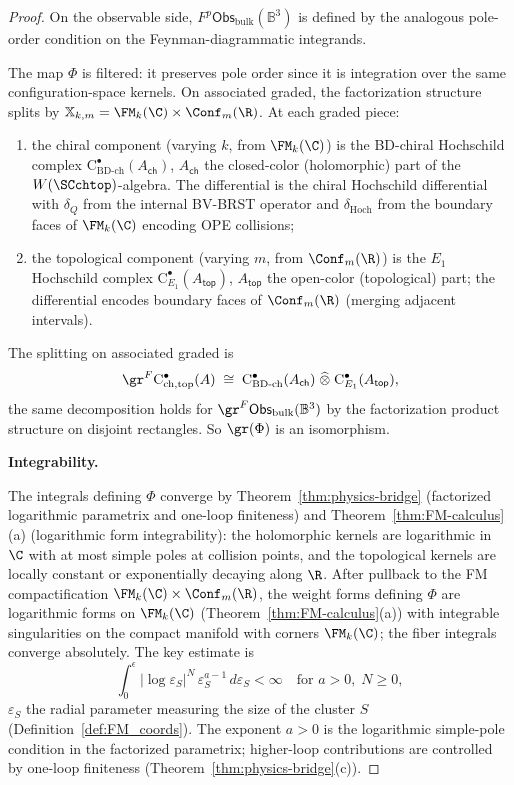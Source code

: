 \begin{proof}
On the observable side, $F^p \mathsf{Obs}_{\mathrm{bulk}}(\mathbb{B}^3)$ is defined by the analogous pole-order condition on the Feynman-diagrammatic integrands.

The map $\Phi$ is filtered: it preserves pole order since it is integration over the same configuration-space kernels. On associated graded, the factorization structure splits by $\mathbb{X}_{k,m} = \FM_k(\C) \times \Conf_m(\R)$. At each graded piece:
\begin{enumerate}[label=(\roman*)]
\item the chiral component (varying $k$, from $\FM_k(\C)$) is the BD-chiral Hochschild complex $\mathrm{C}^\bullet_{\mathrm{BD\text{-}ch}}(A_{\mathsf{ch}})$, $A_{\mathsf{ch}}$ the closed-color (holomorphic) part of the $W(\SCchtop)$-algebra. The differential is the chiral Hochschild differential with $\delta_Q$ from the internal BV-BRST operator and $\delta_{\mathrm{Hoch}}$ from the boundary faces of $\FM_k(\C)$ encoding OPE collisions;
\item the topological component (varying $m$, from $\Conf_m(\R)$) is the $E_1$ Hochschild complex $\mathrm{C}^\bullet_{E_1}(A_{\mathsf{top}})$, $A_{\mathsf{top}}$ the open-color (topological) part; the differential encodes boundary faces of $\Conf_m(\R)$ (merging adjacent intervals).
\end{enumerate}
The splitting on associated graded is
\[
\gr^F \mathrm{C}^\bullet_{\mathrm{ch,top}}(A) \;\cong\; \mathrm{C}^\bullet_{\mathrm{BD\text{-}ch}}(A_{\mathsf{ch}}) \;\widehat\otimes\; \mathrm{C}^\bullet_{E_1}(A_{\mathsf{top}}),
\]
the same decomposition holds for $\gr^F \mathsf{Obs}_{\mathrm{bulk}}(\mathbb{B}^3)$ by the factorization product structure on disjoint rectangles. So $\gr(\Phi)$ is an isomorphism.

\medskip
\textbf{Integrability.}

The integrals defining $\Phi$ converge by Theorem~\ref{thm:physics-bridge} (factorized logarithmic parametrix and one-loop finiteness) and Theorem~\ref{thm:FM-calculus}(a) (logarithmic form integrability): the holomorphic kernels are logarithmic in $\C$ with at most simple poles at collision points, and the topological kernels are locally constant or exponentially decaying along $\R$. After pullback to the FM compactification $\FM_k(\C) \times \Conf_m(\R)$, the weight forms defining $\Phi$ are logarithmic forms on $\FM_k(\C)$ (Theorem~\ref{thm:FM-calculus}(a)) with integrable singularities on the compact manifold with corners $\FM_k(\C)$; the fiber integrals converge absolutely. The key estimate is
\[
\int_0^\epsilon |\log \varepsilon_S|^N \, \varepsilon_S^{a-1} \, d\varepsilon_S < \infty \quad \text{for } a > 0, \; N \geq 0,
\]
$\varepsilon_S$ the radial parameter measuring the size of the cluster $S$ (Definition~\ref{def:FM_coords}). The exponent $a > 0$ is the logarithmic simple-pole condition in the factorized parametrix; higher-loop contributions are controlled by one-loop finiteness (Theorem~\ref{thm:physics-bridge}(c)).


\end{proof}
